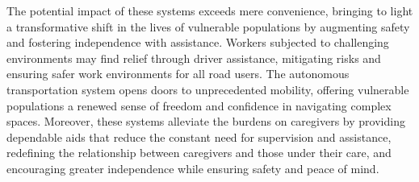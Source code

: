 \documentclass[9pt,conference]{IEEEtran}
\begin{document}
The potential impact of these systems exceeds mere convenience, bringing to light a transformative shift in the lives of vulnerable populations by augmenting safety and fostering independence with assistance. Workers subjected to challenging environments may find relief through driver assistance, mitigating risks and ensuring safer work environments for all road users. The autonomous transportation system opens doors to unprecedented mobility, offering vulnerable populations a renewed sense of freedom and confidence in navigating complex spaces. Moreover, these systems alleviate the burdens on caregivers by providing dependable aids that reduce the constant need for supervision and assistance, redefining the relationship between caregivers and those under their care, and encouraging greater independence while ensuring safety and peace of mind.
\end{document}
